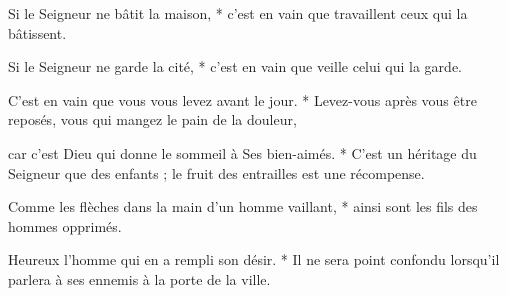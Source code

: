 \item Si le Seigneur ne bâtit la maison, * c'est en vain que travaillent ceux qui la bâtissent.
\item Si le Seigneur ne garde la cité, * c'est en vain que veille celui qui la garde.
\item C'est en vain que vous vous levez avant le jour. * Levez-vous après vous être reposés, vous qui mangez le pain de la douleur,
\item car c'est Dieu qui donne le sommeil à Ses bien-aimés. * C'est un héritage du Seigneur que des enfants ; le fruit des entrailles est une récompense.
\item Comme les flèches dans la main d'un homme vaillant, * ainsi sont les fils des hommes opprimés.
\item Heureux l'homme qui en a rempli son désir. * Il ne sera point confondu lorsqu'il parlera à ses ennemis à la porte de la ville.